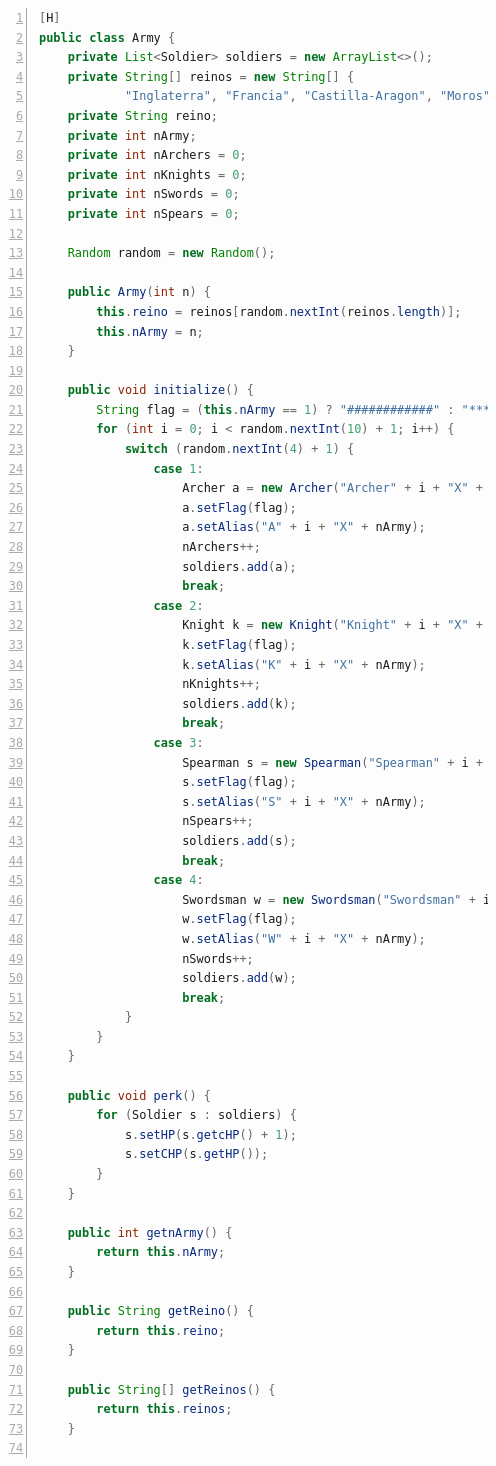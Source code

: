 \documentclass{article}
\begin{document}
	\begin{lstlisting}[language=java,caption={Clase Army}, numbers=left][H]
public class Army {
    private List<Soldier> soldiers = new ArrayList<>();
    private String[] reinos = new String[] {
            "Inglaterra", "Francia", "Castilla-Aragon", "Moros", "Sacro Imperio Romano Germanico" };
    private String reino;
    private int nArmy;
    private int nArchers = 0;
    private int nKnights = 0;
    private int nSwords = 0;
    private int nSpears = 0;

    Random random = new Random();

    public Army(int n) {
        this.reino = reinos[random.nextInt(reinos.length)];
        this.nArmy = n;
    }

    public void initialize() {
        String flag = (this.nArmy == 1) ? "############" : "************";
        for (int i = 0; i < random.nextInt(10) + 1; i++) {
            switch (random.nextInt(4) + 1) {
                case 1:
                    Archer a = new Archer("Archer" + i + "X" + nArmy);
                    a.setFlag(flag);
                    a.setAlias("A" + i + "X" + nArmy);
                    nArchers++;
                    soldiers.add(a);
                    break;
                case 2:
                    Knight k = new Knight("Knight" + i + "X" + nArmy);
                    k.setFlag(flag);
                    k.setAlias("K" + i + "X" + nArmy);
                    nKnights++;
                    soldiers.add(k);
                    break;
                case 3:
                    Spearman s = new Spearman("Spearman" + i + "X" + nArmy);
                    s.setFlag(flag);
                    s.setAlias("S" + i + "X" + nArmy);
                    nSpears++;
                    soldiers.add(s);
                    break;
                case 4:
                    Swordsman w = new Swordsman("Swordsman" + i + "X" + nArmy);
                    w.setFlag(flag);
                    w.setAlias("W" + i + "X" + nArmy);
                    nSwords++;
                    soldiers.add(w);
                    break;
            }
        }
    }

    public void perk() {
        for (Soldier s : soldiers) {
            s.setHP(s.getcHP() + 1);
            s.setCHP(s.getHP());
        }
    }

    public int getnArmy() {
        return this.nArmy;
    }

    public String getReino() {
        return this.reino;
    }

    public String[] getReinos() {
        return this.reinos;
    }


\end{lstlisting}
\end{document}
